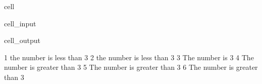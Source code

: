 \documentclass[letterpaper,10pt,english]{jupyterBook}
\begin{document}
\begin{sphinxuseclass}{cell}\begin{sphinxVerbatimInput}

\begin{sphinxuseclass}{cell_input}
\begin{sphinxVerbatim}[commandchars=\\\{\}]
  \PYG{p}{[}\PYG{p}{]}

   
       
         
       
         
         
\end{sphinxVerbatim}

\end{sphinxuseclass}\end{sphinxVerbatimInput}
\begin{sphinxVerbatimOutput}

\begin{sphinxuseclass}{cell_output}
\begin{sphinxVerbatim}[commandchars=\\\{\}]
1 the number is less than 3
2 the number is less than 3
3 The number is 3
4 The number is greater than 3
5 The number is greater than 3
6 The number is greater than 3
\end{sphinxVerbatim}

\end{sphinxuseclass}\end{sphinxVerbatimOutput}

\end{sphinxuseclass}
\end{document}
